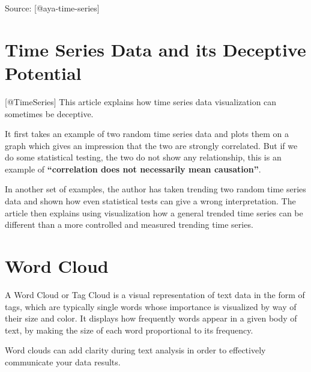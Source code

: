 \documentclass[]{book}
\theoremstyle{definition}
\theoremstyle{definition}
\theoremstyle{definition}
\theoremstyle{remark}
\begin{document}
Source: {[}@aya-time-series{]}

\section{Time Series Data and its Deceptive
Potential}\label{time-series-data-and-its-deceptive-potential}

{[}@TimeSeries{]} This article explains how time series data
visualization can sometimes be deceptive.

It first takes an example of two random time series data and plots them
on a graph which gives an impression that the two are strongly
correlated. But if we do some statistical testing, the two do not show
any relationship, this is an example of \textbf{``correlation does not
necessarily mean causation''}.

In another set of examples, the author has taken trending two random
time series data and shown how even statistical tests can give a wrong
interpretation. The article then explains using visualization how a
general trended time series can be different than a more controlled and
measured trending time series.

\section{Word Cloud}\label{word-cloud}

A Word Cloud or Tag Cloud is a visual representation of text data in the
form of tags, which are typically single words whose importance is
visualized by way of their size and color. It displays how frequently
words appear in a given body of text, by making the size of each word
proportional to its frequency.

Word clouds can add clarity during text analysis in order to effectively
communicate your data results.
\end{document}
